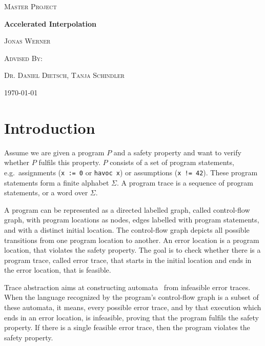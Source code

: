 \documentclass{article}
\newcommand\mycom[1]{}
\newcommand\mycom[1]{#1}
\newcommand{\dd}[1]{\mycom{\todo[color=orange!40,inline]{\small DD: #1}}}
\begin{document}
    \newcommand{\HorizontalLine}{\rule{\linewidth}{0.3mm}}
    
        \begin{center}
        {\scshape\Large Master Project \par}
        \vspace{1.5cm}
        {\huge\bfseries Accelerated Interpolation \par}
        \vspace{1cm}
        {\large \scshape Jonas Werner\par}
        \vspace{0.5cm}
        {\large \scshape Advised By: \par}
        {\large \scshape Dr. Daniel Dietsch, Tanja Schindler \par}
        \vspace{0.5cm}
        {\today \vspace{2cm}} 
        \end{center}

\section{Introduction}
Assume we are given a program $P$ and a safety property and want to verify whether $P$ fulfils this property. 
$P$ consists of a set of program statements, e.g.\ assignments (\texttt{x := 0} or \texttt{havoc x}) or assumptions (\texttt{x != 42}).
These program statements form a finite alphabet $\Sigma$. 
A program trace is a sequence of program statements, or a word over $\Sigma$.

A program can be represented as a directed labelled graph, called control-flow graph, with program locations as nodes, edges labelled with program statements, and with a distinct initial location. 
The control-flow graph depicts all possible transitions from one program location to another. 
An error location is a program location, that violates the safety property. 
The goal is to check whether there is a program trace, called error trace, that starts in the initial location and ends in the error location, that is feasible. 

Trace abstraction aims at constructing automata~\cite{10.1007/978-3-642-39799-8_2} from infeasible error traces. \dd{Is this a good description of TA?}
When the language recognized by the program's control-flow graph\dd{How can a graph recognize a language?} is a subset of these automata, it means, every possible error trace, and by that execution which ends in an error location, is infeasible\dd{what is an infeasible execution?}, proving that the program fulfils the safety property. 
If there is a single feasible error trace, then the program violates the safety property.\dd{what is another word for feasible? Usually, we need to define (in)feasability before using it, so if you can find a better one the intro up to this point will make more sense}
\end{document}
